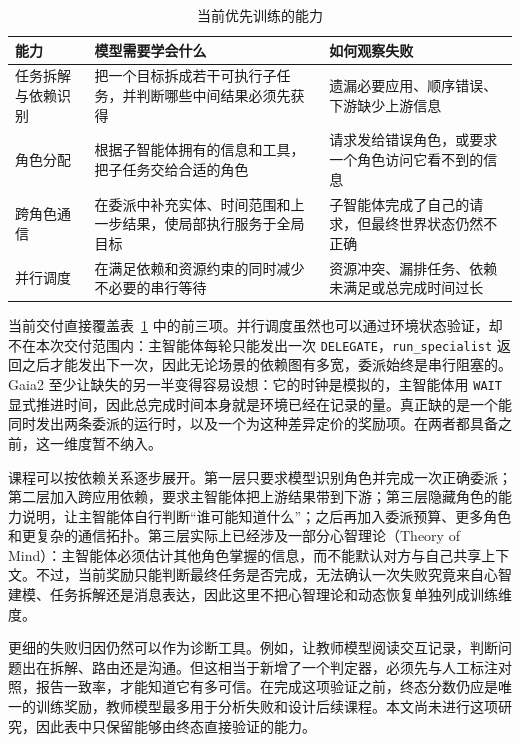 \documentclass[UTF8,11pt,fontset=fandol]{ctexart}
\begin{document}
\begin{table}[H]
\centering
\small
\caption{当前优先训练的能力}
\label{tab:capabilities}
\begin{tabularx}{\textwidth}{>{\raggedright\arraybackslash}p{2.65cm} X >{\raggedright\arraybackslash}p{4.05cm}}
\toprule
能力 & 模型需要学会什么 & 如何观察失败\\
\midrule
任务拆解与依赖识别 & 把一个目标拆成若干可执行子任务，并判断哪些中间结果必须先获得 & 遗漏必要应用、顺序错误、下游缺少上游信息\\
角色分配 & 根据子智能体拥有的信息和工具，把子任务交给合适的角色 & 请求发给错误角色，或要求一个角色访问它看不到的信息\\
跨角色通信 & 在委派中补充实体、时间范围和上一步结果，使局部执行服务于全局目标 & 子智能体完成了自己的请求，但最终世界状态仍然不正确\\
并行调度 & 在满足依赖和资源约束的同时减少不必要的串行等待 & 资源冲突、漏排任务、依赖未满足或总完成时间过长\\
\bottomrule
\end{tabularx}
\end{table}

当前交付直接覆盖表~\ref{tab:capabilities} 中的前三项。并行调度虽然也可以通过环境状态验证，却不在本次交付范围内：主智能体每轮只能发出一次 \texttt{DELEGATE}，\texttt{run\_specialist} 返回之后才能发出下一次，因此无论场景的依赖图有多宽，委派始终是串行阻塞的。Gaia2 至少让缺失的另一半变得容易设想：它的时钟是模拟的，主智能体用 \texttt{WAIT} 显式推进时间，因此总完成时间本身就是环境已经在记录的量。真正缺的是一个能同时发出两条委派的运行时，以及一个为这种差异定价的奖励项。在两者都具备之前，这一维度暂不纳入。

课程可以按依赖关系逐步展开。第一层只要求模型识别角色并完成一次正确委派；第二层加入跨应用依赖，要求主智能体把上游结果带到下游；第三层隐藏角色的能力说明，让主智能体自行判断“谁可能知道什么”；之后再加入委派预算、更多角色和更复杂的通信拓扑。第三层实际上已经涉及一部分心智理论（Theory of Mind）：主智能体必须估计其他角色掌握的信息，而不能默认对方与自己共享上下文。不过，当前奖励只能判断最终任务是否完成，无法确认一次失败究竟来自心智建模、任务拆解还是消息表达，因此这里不把心智理论和动态恢复单独列成训练维度。

更细的失败归因仍然可以作为诊断工具。例如，让教师模型阅读交互记录，判断问题出在拆解、路由还是沟通。但这相当于新增了一个判定器，必须先与人工标注对照，报告一致率，才能知道它有多可信。在完成这项验证之前，终态分数仍应是唯一的训练奖励，教师模型最多用于分析失败和设计后续课程。本文尚未进行这项研究，因此表中只保留能够由终态直接验证的能力。
\end{document}

